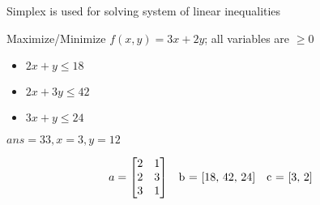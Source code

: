 Simplex is used for solving system of linear inequalities

Maximize/Minimize $f(x,y) = 3x + 2y$; all variables are $\geq 0$ 
\begin{itemize}[noitemsep]
  \item $2x + y \leq 18$
  \item $2x + 3y \leq 42$
  \item $3x + y \leq 24$
\end{itemize}

$ans = 33, x = 3, y = 12$\\

\vspace{-15pt}

\[
a = \begin{bmatrix}
  2 & 1 \\
  2 & 3 \\
  3 & 1 
\end{bmatrix} 
\hspace{10pt}
$b = [18, 42, 24]$
\hspace{10pt} 
$c = [3, 2]$ 
\] 
